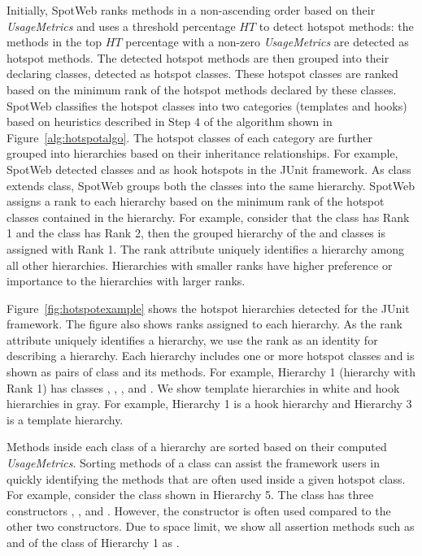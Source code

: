 Initially, SpotWeb ranks methods in a non-ascending order based on
their \emph{UsageMetrics} and uses a threshold percentage $HT$ to
detect hotspot methods: the methods in the top $HT$ percentage with
a non-zero \emph{UsageMetrics} are detected as hotspot methods. 
The detected hotspot methods are then
grouped into their declaring classes, detected as hotspot classes.
These hotspot classes are ranked based on the minimum rank of the
hotspot methods declared by these classes. SpotWeb classifies the
hotspot classes into two categories (templates and hooks) based on
heuristics described in Step 4 of the algorithm shown in Figure~\ref{alg:hotspotalgo}. The hotspot classes of each
category are further grouped into hierarchies based on their
inheritance relationships. For example, SpotWeb detected classes
 and  as hook hotspots in the JUnit
framework. As  class extends  class,
SpotWeb groups both the classes into the same hierarchy. SpotWeb
assigns a rank to each hierarchy based on the minimum rank of the
hotspot classes contained in the hierarchy. For example, consider
that the  class has Rank 1 and the 
class has Rank 2, then the grouped hierarchy of the
 and  classes is assigned with Rank
1. The rank attribute uniquely identifies a hierarchy among all
other hierarchies. Hierarchies with smaller ranks have higher preference
or importance to the hierarchies with larger ranks.

Figure~\ref{fig:hotspotexample} shows the hotspot hierarchies detected for the JUnit
framework. The figure also shows ranks assigned to each hierarchy.
As the rank attribute uniquely identifies a hierarchy, we use the
rank as an identity for describing a hierarchy.
Each hierarchy includes one or more hotspot classes and is shown as pairs of class and its methods.
For example, Hierarchy 1 (hierarchy with Rank 1) has classes , , ,
and . We show template hierarchies in white and hook hierarchies in gray.
For example, Hierarchy 1 is a hook hierarchy and Hierarchy 3 is a template hierarchy.

Methods inside each class of a hierarchy are sorted
based on their computed \emph{UsageMetrics}. Sorting methods of a class
can assist the framework users in quickly identifying the methods that are often
used inside a given hotspot class. For example, consider the  class
shown in Hierarchy 5. The  class has three constructors ,
, and . However, the  constructor
is often used compared to the other two constructors. Due to space limit,
we show all assertion methods such as  and 
of the class  of Hierarchy 1 as .

